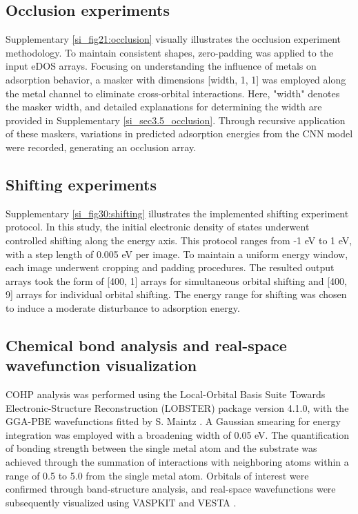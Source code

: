 \subsection{Occlusion experiments}
Supplementary \cref{si_fig21:occlusion} visually illustrates the occlusion experiment methodology.
To maintain consistent shapes, zero-padding was applied to the input eDOS arrays.
Focusing on understanding the influence of metals on adsorption behavior, a masker with dimensions [width, 1, 1] was employed along the metal channel to eliminate cross-orbital interactions.
Here, "width" denotes the masker width, and detailed explanations for determining the width are provided in Supplementary \cref{si_sec3.5_occlusion}.
Through recursive application of these maskers, variations in predicted adsorption energies from the CNN model were recorded, generating an occlusion array.


\subsection{Shifting experiments}
Supplementary \cref{si_fig30:shifting} illustrates the implemented shifting experiment protocol.
In this study, the initial electronic density of states underwent controlled shifting along the energy axis.
This protocol ranges from -1 eV to 1 eV, with a step length of 0.005 eV per image.
To maintain a uniform energy window, each image underwent cropping and padding procedures.
The resulted output arrays took the form of [400, 1] arrays for simultaneous orbital shifting and [400, 9] arrays for individual orbital shifting.
The energy range for shifting was chosen to induce a moderate disturbance to adsorption energy.


\subsection{Chemical bond analysis and real-space wavefunction visualization}
COHP analysis was performed using the Local-Orbital Basis Suite Towards Electronic-Structure Reconstruction (LOBSTER) package  \cite{deringer2011crystal, koga1999analytical, nelson2020lobster, maintz2013analytic, dronskowski1993crystal} version 4.1.0, with the GGA-PBE wavefunctions fitted by S. Maintz \cite{koga1999analytical, maintz2016lobster}.
A Gaussian smearing for energy integration was employed with a broadening width of 0.05 eV.
The quantification of bonding strength between the single metal atom and the substrate was achieved through the summation of interactions with neighboring atoms within a range of 0.5 \text{\AA} to 5.0 \text{\AA} from the single metal atom.
Orbitals of interest were confirmed through band-structure analysis, and real-space wavefunctions were subsequently visualized using VASPKIT \cite{wang2021vaspkit} and VESTA \cite{momma2008vesta}.


